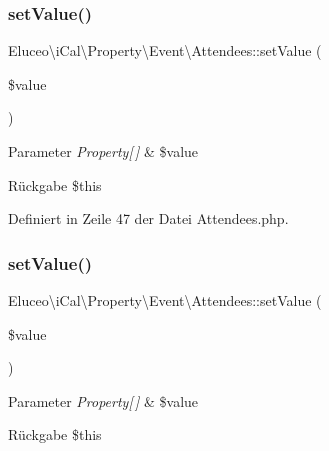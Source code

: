 \subsubsection{\texorpdfstring{set\+Value()}{setValue()}\hspace{0.1cm}{\footnotesize\ttfamily [2/3]}}
{\footnotesize\ttfamily Eluceo\textbackslash{}i\+Cal\textbackslash{}\+Property\textbackslash{}\+Event\textbackslash{}\+Attendees\+::set\+Value (\begin{DoxyParamCaption}\item[{}]{\$value }\end{DoxyParamCaption})}


\begin{DoxyParams}{Parameter}
{\em Property\mbox{[}$\,$\mbox{]}} & \$value\\
\hline
\end{DoxyParams}
\begin{DoxyReturn}{Rückgabe}
\$this 
\end{DoxyReturn}


Definiert in Zeile 47 der Datei Attendees.\+php.

\mbox{\label{class_eluceo_1_1i_cal_1_1_property_1_1_event_1_1_attendees_a9e8601c18fb1556c268b2c5ee355a373}} 
\subsubsection{\texorpdfstring{set\+Value()}{setValue()}\hspace{0.1cm}{\footnotesize\ttfamily [3/3]}}
{\footnotesize\ttfamily Eluceo\textbackslash{}i\+Cal\textbackslash{}\+Property\textbackslash{}\+Event\textbackslash{}\+Attendees\+::set\+Value (\begin{DoxyParamCaption}\item[{}]{\$value }\end{DoxyParamCaption})}


\begin{DoxyParams}{Parameter}
{\em Property\mbox{[}$\,$\mbox{]}} & \$value\\
\hline
\end{DoxyParams}
\begin{DoxyReturn}{Rückgabe}
\$this 
\end{DoxyReturn}


